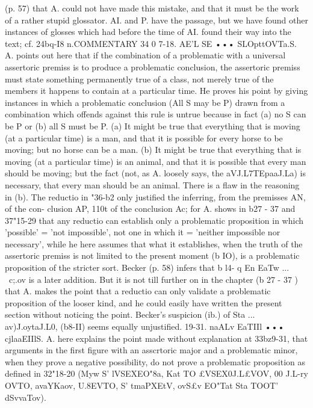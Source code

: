 {{{{(p. 57) that A. could not have made this mistake, and that it
must be the work of a rather stupid glossator. AI. and P. have
the passage, but we have found other instances of glosses which
had before the time of AI. found their way into the text; cf.
24bq-I8 n.COMMENTARY
34 0
7-18. AE'L SE ••• SLOpttOVTa.S. A. points out here that if the
combination of a problematic with a universal assertoric premiss
is to produce a problematic conclusion, the assertoric premiss
must state something permanently true of a class, not merely
true of the members it happens to contain at a particular time.
He proves his point by giving instances in which a problematic
conclusion (All S may be P) drawn from a combination which
offends against this rule is untrue because in fact (a) no S can be
P or (b) all S must be P. (a) It might be true that everything
that is moving (at a particular time) is a man, and that it is
possible for every horse to be moving; but no horse can be a man.
(b) It might be true that everything that is moving (at a particular
time) is an animal, and that it is possible that every man should
be moving; but the fact (not, as A. loosely says, the aVJ.L7TEpaaJ.La)
is necessary, that every man should be an animal.
There is a flaw in the reasoning in (b). The reductio in "36-b2
only justified the inferring, from the premisses AN, of the con-
clusion AP, 110t of the conclusion Ac; for A. shows in b27 - 37 and
37"15-29 that any reductio can establish only a problematic
proposition in which 'possible' = 'not impossible', not one in
which it = 'neither impossible nor necessary', while he here
assumes that what it establishes, when the truth of the assertoric
premiss is not limited to the present moment (b IO), is a problematic
proposition of the stricter sort. Becker (p. 58) infers that b l4- q
En EaTw ... ~c;.ov is a later addition. But it is not till further on
in the chapter (b 27 - 37 ) that A. makes the point that a reductio
can only validate a problematic proposition of the looser kind,
and he could easily have written the present section without
noticing the point. Becker's suspicion (ib.) of Sta ... av)J.oytaJ.L0,
(b8-II) seems equally unjustified.
19-31. naALv EaTIIl ••• cjlaaEIIlS. A. here explains the point
made without explanation at 33bz9-31, that arguments in the first
figure with an asscrtoric major and a problematic minor, when
they prove a negative possibility, do not prove a problematic
proposition as defined in 32"18-20 (Myw S' lVSEXEO"8a, Kat TO
£VSEX0J.L£VOV, 00 J.L-ry OVTO, avaYKa{ov, U.8EVTO, S' tmaPXEtV, ovS£v
EO"Tat Sta TOOT' dSvvaTov).
}}}}}
